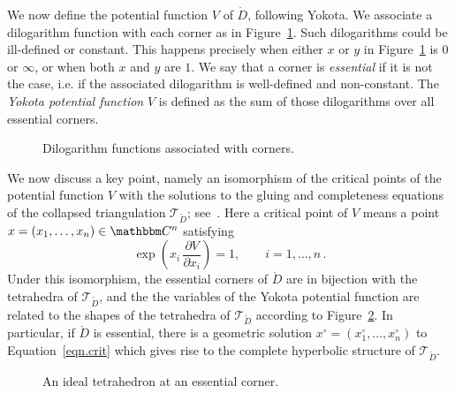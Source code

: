 \documentclass[12pt,reqno]{amsart}
\theoremstyle{definition}
\def\BC{\mathbbm C}
\def\calT{\mathcal T}
\renewcommand{\Ddot}{\mathring{D}}
\begin{document}
We now define the potential function $V$ of $\Ddot$, following Yokota.
We associate a dilogarithm function with each corner as in
Figure~\ref{fig.crossing}.  Such dilogarithms could be ill-defined or constant.
This happens precisely when either $x$ or $y$ in Figure~\ref{fig.crossing} is
$0$ or $\infty$, or when both $x$ and $y$ are $1$. We say that a corner is
\emph{essential} if it is not the case, i.e. if the associated dilogarithm is
well-defined and non-constant. The \emph{Yokota potential function} $V$ is 
defined as the sum of those dilogarithms over all essential corners. 
\begin{figure}[htpb!]

\caption{Dilogarithm functions associated with corners.}
\label{fig.crossing}
\end{figure}

We now discuss a key point, namely an isomorphism of the critical points of the
potential function $V$ with the solutions to the gluing and completeness
equations of the collapsed triangulation $\calT_{\Ddot}$; see~\cite[Thm.4.1]{MY2018}.
Here a critical point of $V$ means a point $x=(x_1,\ldots,x_n) \in \BC^n$
satisfying
\begin{equation}
\label{eqn.crit}
\exp  \left ( x_i \, \dfrac{\partial V}{\partial x_i} \right) = 1,
\qquad i=1,\dots, n\,.
\end{equation}
Under this isomorphism,
the essential corners of $\Ddot$ are in bijection with the tetrahedra of
$\calT_{\Ddot}$, and the the variables of the Yokota potential function are related
to the shapes of the tetrahedra of $\calT_{\Ddot}$ according to
Figure~\ref{fig.crossing2}. In particular, if $\Ddot$ is essential, there is a
geometric solution $x^\circ=(x^\circ_1,\ldots,x^\circ_n)$ to Equation~\eqref{eqn.crit}
which gives rise to the complete hyperbolic structure of $\calT_{\Ddot}$.

\begin{figure}[htpb!]

\caption{An ideal tetrahedron at an essential corner.}
\label{fig.crossing2}
\end{figure}
 
\end{document}
